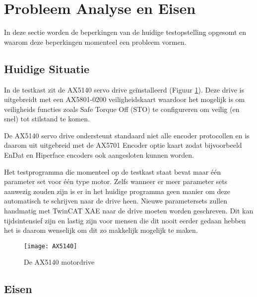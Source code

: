 \section{Probleem Analyse en Eisen} \label{sec:ProbleemAnalyseEnEisen}

In deze sectie worden de beperkingen van de huidige testopstelling opgesomt en waarom deze beperkingen momenteel een probleem vormen.

\subsection{Huidige Situatie}

In de testkast zit de \gls{AX5140} \cite{web:AX5140Drive} servo drive geïnstalleerd (Figuur \ref{fig:AX5140}). Deze drive is uitgebreidt met een \gls{AX5801}-0200 \cite{web:AX5801} veiligheidskaart waardoor het mogelijk is om veiligheids functies zoals Safe Torque Off (\gls{STO}) te configureren om veilig (en snel) tot stilstand te komen.

\vspace{0.5cm}

De \gls{AX5140} servo drive ondersteunt standaard niet alle encoder protocollen en is daarom uit uitgebreid met de \gls{AX5701} \cite{web:AX5701} Encoder optie kaart zodat bijvoorbeeld EnDat en Hiperface encoders ook aangesloten kunnen worden.

\vspace{0.5cm}

Het testprogramma die momenteel op de testkast staat bevat maar één parameter set voor één type motor. Zelfs wanneer er meer parameter sets aanwezig zouden zijn is er in het huidige programma geen manier om deze automatisch te schrijven naar de drive heen. Nieuwe parametersets zullen handmatig met TwinCAT XAE \cite{web:DriveManager2} naar de drive moeten worden geschreven. Dit kan tijdsintensief zijn en lastig zijn voor mensen die dit nooit eerder gedaan hebben het is daarom wenselijk om dit zo makkelijk mogelijk te maken.

\begin{figure}[h]
	\centering
	\texttt{[image: AX5140]}
	\label{fig:AX5140}
	\caption{De \gls{AX5140} motordrive \cite{web:AX5140Drive}}
\end{figure}

\newpage

\subsection{Eisen}


